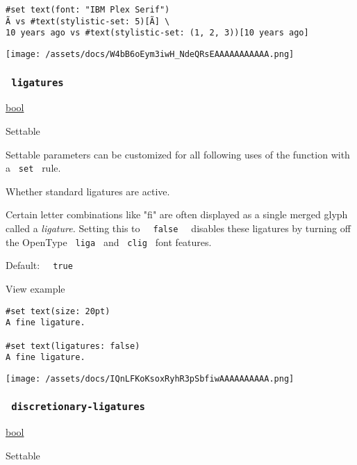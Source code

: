 \begin{verbatim}
#set text(font: "IBM Plex Serif")
Ã vs #text(stylistic-set: 5)[Ã] \
10 years ago vs #text(stylistic-set: (1, 2, 3))[10 years ago]
\end{verbatim}

\texttt{[image: /assets/docs/W4bB6oEym3iwH\_NdeQRsEAAAAAAAAAAA.png]}

\subsubsection{\texorpdfstring{\texttt{\ ligatures\ }}{ ligatures }}\label{parameters-ligatures}

\href{/docs/reference/foundations/bool/}{bool}

{{ Settable }}

\label{parameters-ligatures-settable-tooltip}
Settable parameters can be customized for all following uses of the
function with a \texttt{\ set\ } rule.

Whether standard ligatures are active.

Certain letter combinations like "fi" are often displayed as a single
merged glyph called a \emph{ligature.} Setting this to
\texttt{\ }{\texttt{\ false\ }}\texttt{\ } disables these ligatures by
turning off the OpenType \texttt{\ liga\ } and \texttt{\ clig\ } font
features.

Default: \texttt{\ }{\texttt{\ true\ }}\texttt{\ }


View example

\begin{verbatim}
#set text(size: 20pt)
A fine ligature.

#set text(ligatures: false)
A fine ligature.
\end{verbatim}

\texttt{[image: /assets/docs/IQnLFKoKsoxRyhR3pSbfiwAAAAAAAAAA.png]}

\subsubsection{\texorpdfstring{\texttt{\ discretionary-ligatures\ }}{ discretionary-ligatures }}\label{parameters-discretionary-ligatures}

\href{/docs/reference/foundations/bool/}{bool}

{{ Settable }}

